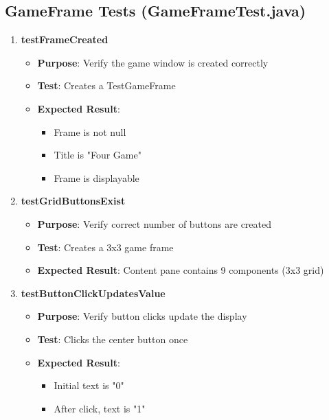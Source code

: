 \documentclass[12pt,a4paper]{article}
\begin{document}
\subsection{GameFrame Tests (GameFrameTest.java)}

\begin{enumerate}
    \item \textbf{testFrameCreated}
    \begin{itemize}
        \item \textbf{Purpose}: Verify the game window is created correctly
        \item \textbf{Test}: Creates a TestGameFrame
        \item \textbf{Expected Result}: 
        \begin{itemize}
            \item Frame is not null
            \item Title is "Four Game"
            \item Frame is displayable
        \end{itemize}
    \end{itemize}
    
    \item \textbf{testGridButtonsExist}
    \begin{itemize}
        \item \textbf{Purpose}: Verify correct number of buttons are created
        \item \textbf{Test}: Creates a 3x3 game frame
        \item \textbf{Expected Result}: Content pane contains 9 components (3x3 grid)
    \end{itemize}
    
    \item \textbf{testButtonClickUpdatesValue}
    \begin{itemize}
        \item \textbf{Purpose}: Verify button clicks update the display
        \item \textbf{Test}: Clicks the center button once
        \item \textbf{Expected Result}: 
        \begin{itemize}
            \item Initial text is "0"
            \item After click, text is "1"
        \end{itemize}
    \end{itemize}
    

\end{enumerate}
\end{document}
